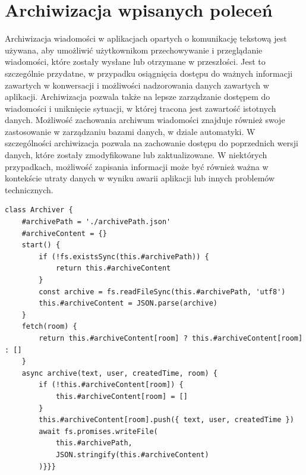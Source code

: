 \section{Archiwizacja wpisanych poleceń}
Archiwizacja wiadomości w aplikacjach opartych o komunikację tekstową jest używana, aby umożliwić użytkownikom przechowywanie i przeglądanie wiadomości, które zostały wysłane lub otrzymane w przeszłości. Jest to szczególnie przydatne, w przypadku osiągnięcia dostępu do ważnych informacji zawartych w konwersacji i możliwości nadzorowania danych zawartych w aplikacji. Archiwizacja pozwala także na lepsze zarządzanie dostępem do wiadomości i uniknięcie sytuacji, w której tracona jest zawartość istotnych danych. Możliwość zachowania archiwum wiadomości znajduje również swoje zastosowanie w zarządzaniu bazami danych, w dziale automatyki. W szczególności archiwizacja pozwala na zachowanie dostępu do poprzednich wersji danych, które zostały zmodyfikowane lub zaktualizowane. W niektórych przypadkach, możliwość zapisania informacji może być również ważna w kontekście utraty danych w wyniku awarii aplikacji lub innych problemów technicznych.
\begin{lstlisting}[caption=Implementacja funkcji archiwizującej wiadomości w komunikatorze]
class Archiver {
    #archivePath = './archivePath.json'
    #archiveContent = {}
    start() {
        if (!fs.existsSync(this.#archivePath)) {
            return this.#archiveContent
        }
        const archive = fs.readFileSync(this.#archivePath, 'utf8')
        this.#archiveContent = JSON.parse(archive)
    }
    fetch(room) {
        return this.#archiveContent[room] ? this.#archiveContent[room] : []
    }
    async archive(text, user, createdTime, room) {
        if (!this.#archiveContent[room]) {
            this.#archiveContent[room] = []
        }
        this.#archiveContent[room].push({ text, user, createdTime })
        await fs.promises.writeFile(
            this.#archivePath,
            JSON.stringify(this.#archiveContent)
        )}}}
\end{lstlisting}

